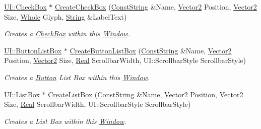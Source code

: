 \begin{DoxyCompactItemize}
\hyperlink{classphys_1_1UI_1_1CheckBox}{UI::CheckBox} $\ast$ \hyperlink{classphys_1_1UI_1_1Window_a9178c34cd4cd68d18056e7131ae0a77a}{CreateCheckBox} (\hyperlink{namespacephys_a5ce5049f8b4bf88d6413c47b504ebb31}{ConstString} \&Name, \hyperlink{classphys_1_1Vector2}{Vector2} Position, \hyperlink{classphys_1_1Vector2}{Vector2} Size, \hyperlink{namespacephys_a460f6bc24c8dd347b05e0366ae34f34a}{Whole} Glyph, \hyperlink{namespacephys_aa03900411993de7fbfec4789bc1d392e}{String} \&LabelText)
\begin{DoxyCompactList}\small\item\em Creates a \hyperlink{classphys_1_1UI_1_1CheckBox}{CheckBox} within this \hyperlink{classphys_1_1UI_1_1Window}{Window}. \item\end{DoxyCompactList}\item 
\hyperlink{classphys_1_1UI_1_1ButtonListBox}{UI::ButtonListBox} $\ast$ \hyperlink{classphys_1_1UI_1_1Window_af610b6a37bfe4d6c2050f2fba3977020}{CreateButtonListBox} (\hyperlink{namespacephys_a5ce5049f8b4bf88d6413c47b504ebb31}{ConstString} \&Name, \hyperlink{classphys_1_1Vector2}{Vector2} Position, \hyperlink{classphys_1_1Vector2}{Vector2} Size, \hyperlink{namespacephys_af7eb897198d265b8e868f45240230d5f}{Real} ScrollbarWidth, UI::ScrollbarStyle ScrollbarStyle)
\begin{DoxyCompactList}\small\item\em Creates a \hyperlink{classphys_1_1UI_1_1Button}{Button} List Box within this \hyperlink{classphys_1_1UI_1_1Window}{Window}. \item\end{DoxyCompactList}\item 
\hyperlink{classphys_1_1UI_1_1ListBox}{UI::ListBox} $\ast$ \hyperlink{classphys_1_1UI_1_1Window_a551f162bdb505f3fc497ff19d8ed9f01}{CreateListBox} (\hyperlink{namespacephys_a5ce5049f8b4bf88d6413c47b504ebb31}{ConstString} \&Name, \hyperlink{classphys_1_1Vector2}{Vector2} Position, \hyperlink{classphys_1_1Vector2}{Vector2} Size, \hyperlink{namespacephys_af7eb897198d265b8e868f45240230d5f}{Real} ScrollbarWidth, UI::ScrollbarStyle ScrollbarStyle)
\begin{DoxyCompactList}\small\item\em Creates a List Box within this \hyperlink{classphys_1_1UI_1_1Window}{Window}. \item\end{DoxyCompactList}\end{DoxyCompactItemize}
